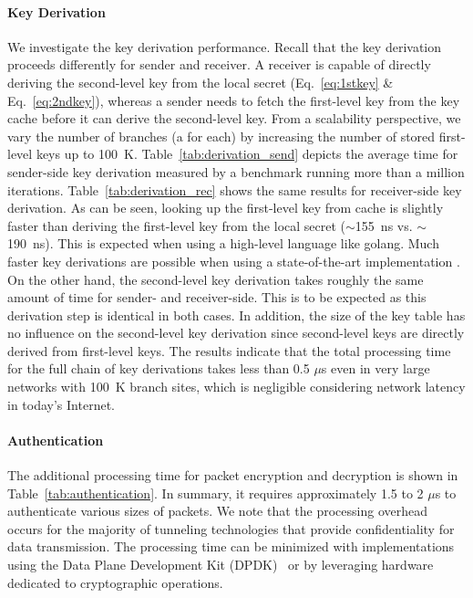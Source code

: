 \paragraph{Key Derivation}
We investigate the key derivation performance. Recall that the key derivation proceeds
differently for sender and receiver. A receiver is capable of directly deriving the
second-level key from the local secret (Eq.~\ref{eq:1stkey} \& Eq.~\ref{eq:2ndkey}),
whereas a sender needs to fetch the first-level key from the key cache before it can derive the second-level key.
From a scalability perspective, we vary the number of branches (a \tp for each) by increasing the number of stored
first-level keys up to \SI{100}{K}. Table~\ref{tab:derivation_send} depicts the average time for sender-side key derivation
measured by a benchmark running more than a million iterations. Table~\ref{tab:derivation_rec} shows the same results for
receiver-side key derivation. As can be seen, looking up the first-level key from cache is slightly faster than
deriving the first-level key from the local secret ($\sim$\SI{155}{ns} vs. $\sim$\SI{190}{ns}).
This is expected when using a high-level language like golang.
Much faster key derivations are possible when using a state-of-the-art implementation \cite{rot2020piskes}.
On the other hand, the second-level key derivation takes roughly the same amount of time for sender- and receiver-side.
This is to be expected as this derivation step is identical in both cases. In addition, the size of the key table
has no influence on the second-level key derivation since second-level keys are directly derived from first-level keys.
The results indicate that the total processing time for the full chain of key derivations takes less than 0.5 $\mu$s
even in very large networks with \SI{100}{K} branch sites, which is negligible considering
network latency in today's Internet.

\paragraph{Authentication}
The additional processing time for packet encryption and decryption is shown in
Table~\ref{tab:authentication}. In summary, it requires approximately 1.5 to 2 $\mu$s to
authenticate various sizes of packets. We note that the processing overhead occurs for the majority
of tunneling technologies that provide confidentiality for data transmission. The processing
time can be minimized with implementations using the Data Plane Development Kit
(DPDK)~\cite{dpdk} or by leveraging hardware dedicated to cryptographic
operations.

